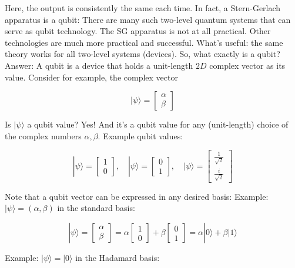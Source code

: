 \documentclass[main.tex]{subfiles}
\begin{document}
    Here, the output is consistently the same each time. In fact, a Stern-Gerlach apparatus is a qubit: There are many such two-level quantum systems that can serve as qubit technology. The SG apparatus is not at all practical. Other technologies are much more practical and successful. What's useful: the same theory works for all two-level systems (devices). So, what exactly is a qubit? Answer: A qubit is a device that holds a unit-length $2 D$ complex vector as its value. Consider for example, the complex vector
    
    $$
    |\psi\rangle=\left[\begin{array}{l}
    \alpha \\
    \beta
    \end{array}\right]
    $$
    
    Is $|\psi\rangle$ a qubit value? Yes! And it's a qubit value for any (unit-length) choice of the complex numbers $\alpha, \beta$. Example qubit values:
    
    $$
    |\psi\rangle=\left[\begin{array}{l}
    1 \\
    0
    \end{array}\right], \quad|\psi\rangle=\left[\begin{array}{l}
    0 \\
    1
    \end{array}\right], \quad|\psi\rangle=\left[\begin{array}{c}
    \frac{1}{\sqrt{2}} \\
    \frac{i}{\sqrt{2}}
    \end{array}\right]
    $$
    
    Note that a qubit vector can be expressed in any desired basis: Example: $|\psi\rangle=(\alpha, \beta)$ in the standard basis:
    
    $$
    |\psi\rangle=\left[\begin{array}{l}
    \alpha \\
    \beta
    \end{array}\right]=\alpha\left[\begin{array}{l}
    1 \\
    0
    \end{array}\right]+\beta\left[\begin{array}{l}
    0 \\
    1
    \end{array}\right]=\alpha|0\rangle+\beta|1\rangle
    $$
    
    Example: $|\psi\rangle=|0\rangle$ in the Hadamard basis:
    
\end{document}
